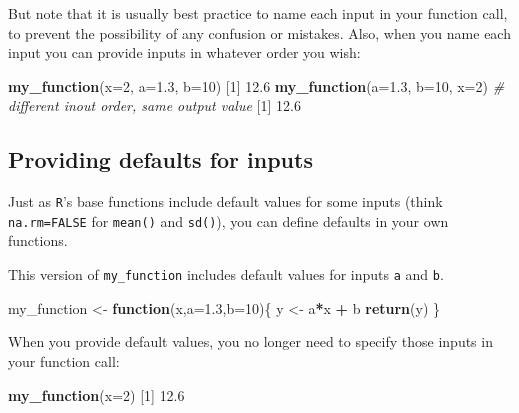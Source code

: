 \documentclass[]{book}
\newenvironment{Shaded}{\begin{snugshade}}{\end{snugshade}}
\newcommand{\CommentTok}[1]{\textcolor[rgb]{0.56,0.35,0.01}{\textit{#1}}}
\newcommand{\ControlFlowTok}[1]{\textcolor[rgb]{0.13,0.29,0.53}{\textbf{#1}}}
\newcommand{\DataTypeTok}[1]{\textcolor[rgb]{0.13,0.29,0.53}{#1}}
\newcommand{\DecValTok}[1]{\textcolor[rgb]{0.00,0.00,0.81}{#1}}
\newcommand{\FloatTok}[1]{\textcolor[rgb]{0.00,0.00,0.81}{#1}}
\newcommand{\KeywordTok}[1]{\textcolor[rgb]{0.13,0.29,0.53}{\textbf{#1}}}
\newcommand{\NormalTok}[1]{#1}
\newcommand{\OperatorTok}[1]{\textcolor[rgb]{0.81,0.36,0.00}{\textbf{#1}}}
\newcommand{\StringTok}[1]{\textcolor[rgb]{0.31,0.60,0.02}{#1}}
\begin{document}
But note that it is usually best practice to name each input in your function call, to prevent the possibility of any confusion or mistakes. Also, when you name each input you can provide inputs in whatever order you wish:

\begin{Shaded}
\begin{Highlighting}[]
\KeywordTok{my_function}\NormalTok{(}\DataTypeTok{x=}\DecValTok{2}\NormalTok{, }\DataTypeTok{a=}\FloatTok{1.3}\NormalTok{, }\DataTypeTok{b=}\DecValTok{10}\NormalTok{)}
\NormalTok{[}\DecValTok{1}\NormalTok{] }\FloatTok{12.6}
\KeywordTok{my_function}\NormalTok{(}\DataTypeTok{a=}\FloatTok{1.3}\NormalTok{, }\DataTypeTok{b=}\DecValTok{10}\NormalTok{, }\DataTypeTok{x=}\DecValTok{2}\NormalTok{) }\CommentTok{# different inout order, same output value}
\NormalTok{[}\DecValTok{1}\NormalTok{] }\FloatTok{12.6}
\end{Highlighting}
\end{Shaded}

\hypertarget{providing-defaults-for-inputs}{%
\subsection*{Providing defaults for inputs}\label{providing-defaults-for-inputs}}

Just as \texttt{R}'s base functions include default values for some inputs (think \texttt{na.rm=FALSE} for \texttt{mean()} and \texttt{sd()}), you can define defaults in your own functions.

This version of \texttt{my\_function} includes default values for inputs \texttt{a} and \texttt{b}.

\begin{Shaded}
\begin{Highlighting}[]
\NormalTok{my_function <-}\StringTok{ }\ControlFlowTok{function}\NormalTok{(x,}\DataTypeTok{a=}\FloatTok{1.3}\NormalTok{,}\DataTypeTok{b=}\DecValTok{10}\NormalTok{)\{}
\NormalTok{  y <-}\StringTok{ }\NormalTok{a}\OperatorTok{*}\NormalTok{x }\OperatorTok{+}\StringTok{ }\NormalTok{b}
  \KeywordTok{return}\NormalTok{(y)}
\NormalTok{\}}
\end{Highlighting}
\end{Shaded}

When you provide default values, you no longer need to specify those inputs in your function call:

\begin{Shaded}
\begin{Highlighting}[]
\KeywordTok{my_function}\NormalTok{(}\DataTypeTok{x=}\DecValTok{2}\NormalTok{)}
\NormalTok{[}\DecValTok{1}\NormalTok{] }\FloatTok{12.6}
\end{Highlighting}
\end{Shaded}
\end{document}
